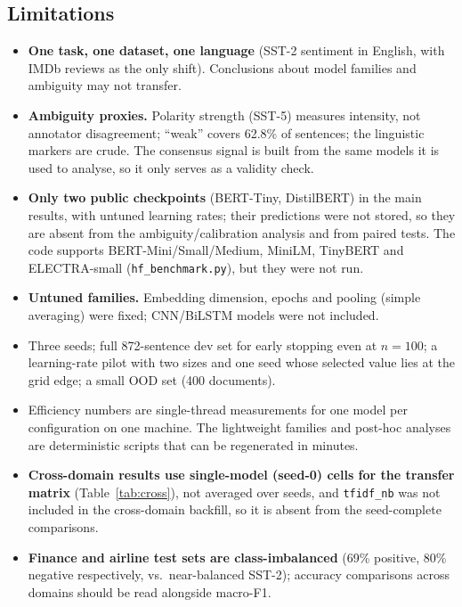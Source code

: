 \documentclass[11pt,a4paper]{article}
\begin{document}
\subsection*{Limitations}
\begin{itemize}
\item \textbf{One task, one dataset, one language} (SST-2 sentiment in English, with IMDb reviews as the only shift). Conclusions about model families and ambiguity may not transfer.
\item \textbf{Ambiguity proxies.} Polarity strength (SST-5) measures intensity, not annotator disagreement; ``weak'' covers 62.8\% of sentences; the linguistic markers are crude. The consensus signal is built from the same models it is used to analyse, so it only serves as a validity check.
\item \textbf{Only two public checkpoints} (BERT-Tiny, DistilBERT) in the main results, with untuned learning rates; their predictions were not stored, so they are absent from the ambiguity/calibration analysis and from paired tests. The code supports BERT-Mini/Small/Medium, MiniLM, TinyBERT and ELECTRA-small (\texttt{hf\_benchmark.py}), but they were not run.
\item \textbf{Untuned families.} Embedding dimension, epochs and pooling (simple averaging) were fixed; CNN/BiLSTM models were not included.
\item Three seeds; full 872-sentence dev set for early stopping even at $n=100$; a learning-rate pilot with two sizes and one seed whose selected value lies at the grid edge; a small OOD set (400 documents).
\item Efficiency numbers are single-thread measurements for one model per configuration on one machine. The lightweight families and post-hoc analyses are deterministic scripts that can be regenerated in minutes.
\item \textbf{Cross-domain results use single-model (seed-0) cells for the transfer matrix} (Table~\ref{tab:cross}), not averaged over seeds, and \texttt{tfidf\_nb} was not included in the cross-domain backfill, so it is absent from the seed-complete comparisons.
\item \textbf{Finance and airline test sets are class-imbalanced} (69\% positive, 80\% negative respectively, vs.\ near-balanced SST-2); accuracy comparisons across domains should be read alongside macro-F1.
\end{itemize}
\end{document}
